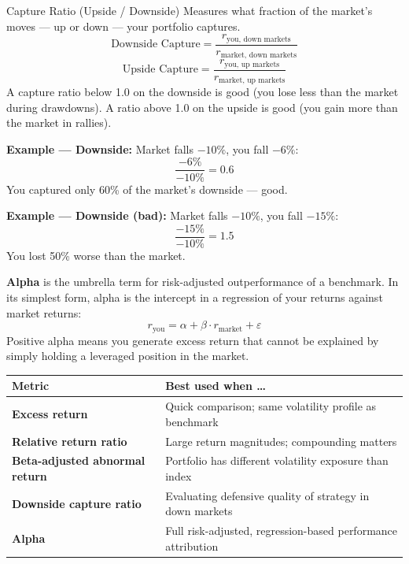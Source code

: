 \begin{keyterm}{Capture Ratio (Upside / Downside)}
Measures what fraction of the market's moves — up or down — your portfolio captures.
\[
  \text{Downside Capture} = \frac{r_{\text{you, down markets}}}{r_{\text{market, down markets}}}
\]
\[
  \text{Upside Capture} = \frac{r_{\text{you, up markets}}}{r_{\text{market, up markets}}}
\]
A capture ratio below 1.0 on the downside is good (you lose less than the market
during drawdowns). A ratio above 1.0 on the upside is good (you gain more than the
market in rallies).

\textbf{Example — Downside:} Market falls $-10\%$, you fall $-6\%$:
\[
  \frac{-6\%}{-10\%} = 0.6
\]
You captured only 60\% of the market's downside — good.

\textbf{Example — Downside (bad):} Market falls $-10\%$, you fall $-15\%$:
\[
  \frac{-15\%}{-10\%} = 1.5
\]
You lost 50\% worse than the market.
\end{keyterm}

\begin{notebox}
\textbf{Alpha} is the umbrella term for risk-adjusted outperformance of a benchmark.
In its simplest form, alpha is the intercept in a regression of your returns against
market returns:
\[
  r_{\text{you}} = \alpha + \beta \cdot r_{\text{market}} + \varepsilon
\]
Positive alpha means you generate excess return that cannot be explained by
simply holding a leveraged position in the market.
\end{notebox}

\begin{center}
\begin{tabular}{>{\bfseries}p{4.5cm} p{7.5cm}}
\toprule
Metric & Best used when \ldots \\
\midrule
Excess return & Quick comparison; same volatility profile as benchmark \\
Relative return ratio & Large return magnitudes; compounding matters \\
Beta-adjusted abnormal return & Portfolio has different volatility exposure than index \\
Downside capture ratio & Evaluating defensive quality of strategy in down markets \\
Alpha & Full risk-adjusted, regression-based performance attribution \\
\bottomrule
\end{tabular}
\end{center}

